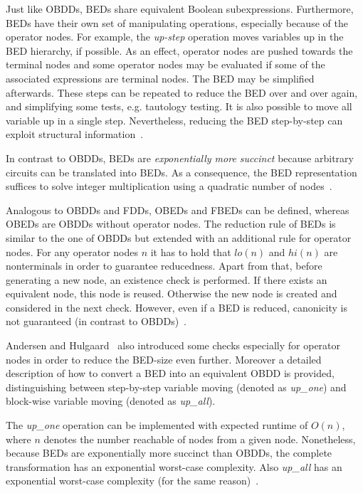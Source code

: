 \documentclass{vldb}
\begin{document}
Just like OBDDs, BEDs share equivalent Boolean subexpressions. Furthermore, BEDs
have their own set of manipulating operations, especially because of the operator
nodes. For example, the \textit{up-step} operation moves variables up in the BED
hierarchy, if possible. As an effect, operator nodes are pushed towards the
terminal nodes and some operator nodes may be evaluated if some of the associated
expressions are terminal nodes. The BED may be simplified afterwards. These steps
can be repeated to reduce the BED over and over again, and simplifying some tests,
e.g. tautology testing. It is also possible to move all variable up in a single
step. Nevertheless, reducing the BED step-by-step can exploit structural
information~\cite{ANDERSEN97}.

In contrast to OBDDs, BEDs are \textit{exponentially more succinct} because
arbitrary circuits can be translated into BEDs. As a consequence, the BED
representation suffices to solve integer multiplication using a quadratic number
of nodes~\cite{ANDERSEN97}. 

Analogous to OBDDs and FDDs, OBEDs and FBEDs can be defined, whereas OBEDs are
OBDDs without operator nodes. The reduction rule of BEDs is similar to the one
of OBDDs but extended with an additional rule for operator nodes. For any operator
nodes $n$ it has to hold that $lo(n)$ and $hi(n)$ are nonterminals in order to
guarantee reducedness. Apart from that, before generating a new node, an existence
check is performed. If there exists an equivalent node, this node is reused.
Otherwise the new node is created and considered in the next check. However, even
if a BED is reduced, canonicity is not guaranteed (in contrast to
OBDDs)~\cite{ANDERSEN97}.

Andersen and Hulgaard~\cite{ANDERSEN97} also introduced some checks especially
for operator nodes in order to reduce the BED-size even further. Moreover a
detailed description of how to convert a BED into an equivalent OBDD is provided,
distinguishing between step-by-step variable moving (denoted as \textit{up\_one})
and block-wise variable moving (denoted as \textit{up\_all}).
 
The \textit{up\_one} operation can be implemented with expected runtime of $O(n)$,
where $n$ denotes the number reachable of nodes from a given node. Nonetheless,
because BEDs are exponentially more succinct than OBDDs, the complete
transformation has an exponential worst-case complexity. Also \textit{up\_all} has
an exponential worst-case complexity (for the same reason)~\cite{ANDERSEN97}.
\end{document}
